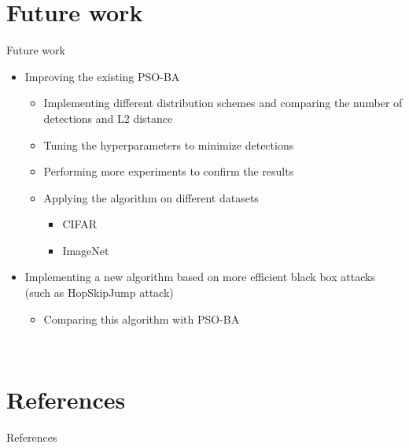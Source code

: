 \documentclass[11pt,t]{beamer}
\begin{document}
\section{Future work}
\begin{frame}{Future work}
\begin{itemize}
	\item Improving the existing PSO-BA
	\begin{itemize}
		\item Implementing different distribution schemes and comparing the number of detections and L2 distance
		\item Tuning the hyperparameters to minimize detections
		\item Performing more experiments to confirm the results
		\item Applying the algorithm on different datasets
		\begin{itemize}
			\item CIFAR
			\item ImageNet
		\end{itemize}
	\end{itemize}
	\item Implementing a new algorithm based on more efficient black box attacks (such as HopSkipJump attack)
	\begin{itemize}
		\item Comparing this algorithm with PSO-BA
	\end{itemize}
\end{itemize}
\end{frame}

\begin{frame}

\centering
\textcolor{white}{Questions?}
\end{frame}

\appendix
\section*{References}
\begin{frame}[allowframebreaks]{References}


\end{frame}
\end{document}
